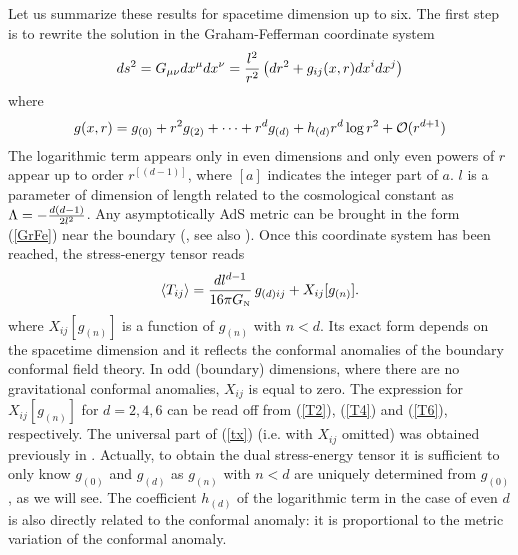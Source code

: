 \documentclass{article}
\def\m3{{\mu_1\mu_2\mu_3}}
\def\co{{\rm Com}}
\def\p{{(+)}}
\def\be{\begin{equation}}       \def\eq{\begin{equation}}
\def\ee{\end{equation}}         \def\eqe{\end{equation}}
\def\m{\mu}
\def\n{\nu}
\def\p{\pi}                %
\def\L{\Lambda}
\def\co{{\cal O}}
\def\>{\rangle} %
\def\<{\langle} %
\newcommand{\tnnn}[1]{\mbox{\tiny #1}}
\def\GN{G_{\mbox{\tnnn N}}}
\begin{document}
Let us summarize these results for spacetime 
dimension up to six. The first step is to 
rewrite the solution in the Graham-Fefferman
coordinate system \cite{FeffermanGraham}
\be \label{GrFe}
ds^2=G_{\m \n} dx^\m dx^\n = {l^2 \over r^2}\left(dr^2 + 
g_{ij}(x,r) dx^i dx^j\right)
\ee
where 
\be
g(x,r)=g_{(0)} + r^2 g_{(2)}+ \cdots + r^d g_{(d)} + h_{(d)} r^{d} \log r^2 +
\co(r^{d+1})
\ee
The logarithmic term appears only in even dimensions and
only even powers of $r$ appear up to order $r^{[(d-1)]}$, where 
$[a]$ indicates the integer part of $a$. $l$ is a parameter of 
dimension of length related to the cosmological constant as 
$\L=-{d(d-1) \over 2 l^2}$. Any asymptotically AdS metric can be brought in 
the form (\ref{GrFe}) near the boundary (\cite{GrahamLee}, 
see also \cite{GrahamWitten,Graham}). Once this coordinate 
system has been reached, the stress-energy tensor 
reads
\be \label{tx}
\<T_{ij}\>={d l^{d-1} \over 16 \p \GN}\, g_{(d)ij} + X_{ij}[g_{(n)}].
\ee
where $X_{ij}[g_{(n)}]$ is a function of $g_{(n)}$ with $n<d$.
Its exact form depends on the spacetime dimension and it reflects the
conformal anomalies of the boundary conformal field theory.
In odd (boundary) dimensions, where there are no gravitational conformal
anomalies, $X_{ij}$ is equal to zero. The expression for $X_{ij}[g_{(n)}]$
for $d=2,4,6$ can be read off from (\ref{T2}), (\ref{T4}) and (\ref{T6}),
respectively.
The universal part of (\ref{tx}) (i.e. with $X_{ij}$ omitted)  
was obtained previously in \cite{Myers}. 
Actually, to obtain the dual stress-energy tensor it is 
sufficient to only know $g_{(0)}$ and $g_{(d)}$ as $g_{(n)}$ with 
$n<d$ are uniquely determined from $g_{(0)}$, as we will see. 
The coefficient $h_{(d)}$ of the logarithmic term 
in the case of even $d$ is also directly related to the 
conformal anomaly: it is proportional to the metric 
variation of the conformal anomaly.
 
\end{document}
